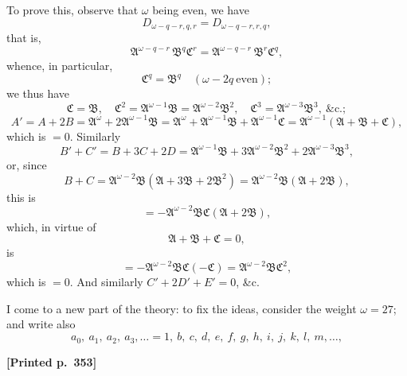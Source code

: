 \documentclass[11pt]{article}
\begin{document}
To prove this, observe that $\omega$ being even, we have
\[
D_{\omega - q - r, q, r} = D_{\omega - q - r, r, q},
\]
that is,
\[
\mathfrak{A}^{\omega - q - r}\,\mathfrak{B}^{q}\mathfrak{C}^{r} = \mathfrak{A}^{\omega - q - r}\,\mathfrak{B}^{r}\mathfrak{C}^{q},
\]
whence, in particular,
\[
\mathfrak{C}^{q} = \mathfrak{B}^{q}\quad (\omega - 2q\ \text{even});
\]
we thus have
\[
\mathfrak{C} = \mathfrak{B},\quad \mathfrak{C}^{2} = \mathfrak{A}^{\omega - 1}\mathfrak{B} = \mathfrak{A}^{\omega - 2}\mathfrak{B}^{2},\quad \mathfrak{C}^{3} = \mathfrak{A}^{\omega - 3}\mathfrak{B}^{3},\ \&\text{c.};
\]
\[
A' = A + 2B = \mathfrak{A}^{\omega} + 2\mathfrak{A}^{\omega - 1}\mathfrak{B} = \mathfrak{A}^{\omega} + \mathfrak{A}^{\omega - 1}\mathfrak{B} + \mathfrak{A}^{\omega - 1}\mathfrak{C} = \mathfrak{A}^{\omega - 1}(\mathfrak{A} + \mathfrak{B} + \mathfrak{C}),
\]
which is $= 0$. Similarly
\[
B' + C' = B + 3C + 2D = \mathfrak{A}^{\omega - 1}\mathfrak{B} + 3\mathfrak{A}^{\omega - 2}\mathfrak{B}^{2} + 2\mathfrak{A}^{\omega - 3}\mathfrak{B}^{3},
\]
or, since
\[
B + C = \mathfrak{A}^{\omega - 2}\mathfrak{B}(\mathfrak{A} + 3\mathfrak{B} + 2\mathfrak{B}^{2}) = \mathfrak{A}^{\omega - 2}\mathfrak{B}(\mathfrak{A} + 2\mathfrak{B}),
\]
this is
\[
= -\mathfrak{A}^{\omega - 2}\mathfrak{B}\mathfrak{C}(\mathfrak{A} + 2\mathfrak{B}),
\]
which, in virtue of
\[
\mathfrak{A} + \mathfrak{B} + \mathfrak{C} = 0,
\]
is
\[
= -\mathfrak{A}^{\omega - 2}\mathfrak{B}\mathfrak{C}(-\mathfrak{C}) = \mathfrak{A}^{\omega - 2}\mathfrak{B}\mathfrak{C}^{2},
\]
which is $= 0$. And similarly $C' + 2D' + E' = 0$, \&c.

I come to a new part of the theory: to fix the ideas, consider the weight $\omega = 27$; and write also
\[
a_{0},\ a_{1},\ a_{2},\ a_{3}, \dots = 1,\ b,\ c,\ d,\ e,\ f,\ g,\ h,\ i,\ j,\ k,\ l,\ m, \dots,
\]

\medskip

\noindent\textbf{[Printed p.~353]}\hfill
\end{document}
